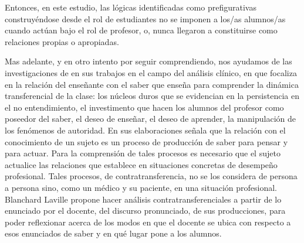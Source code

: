 \documentclass[oneside,spanish]{amsart}
\numberwithin{equation}{section}
\numberwithin{figure}{section}
\theoremstyle{definition}
\begin{document}
Entonces, en este estudio, las lógicas identificadas como prefigurativas construyéndose desde el rol de estudiantes no se imponen a los/as alumnos/as cuando actúan bajo el rol de profesor, o, nunca llegaron a constituirse como relaciones propias o apropiadas. 

Mas adelante, y en otro intento por seguir comprendiendo, nos ayudamos de las investigaciones de \cite{laville04} en sus trabajos en el campo del análisis clínico, en que focaliza en la relación del enseñante con el saber que enseña para comprender la dinámica transferencial de la clase: los núcleos duros que se evidencian en la persistencia en el no entendimiento, el investimento que hacen los alumnos del profesor como poseedor del saber, el deseo de enseñar, el deseo de aprender, la manipulación de los fenómenos de autoridad. En sus elaboraciones señala que la relación con el conocimiento de un sujeto es un proceso de producción de saber para pensar y para actuar. Para la comprensión de tales procesos es necesario que el sujeto actualice las relaciones que establece en situaciones concretas de desempeño profesional. Tales procesos, de contratransferencia, no se los considera de persona a persona sino, como un médico y su paciente, en una situación profesional. Blanchard Laville propone hacer análisis contratransferenciales a partir de lo enunciado por el docente, del discurso pronunciado, de sus producciones, para poder reflexionar acerca de los modos en que el docente se ubica con respecto a esos enunciados de saber y en qué lugar pone a los alumnos.
\end{document}
